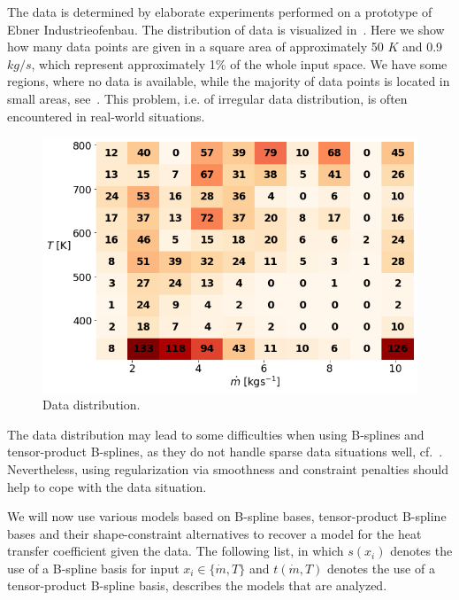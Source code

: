 The data is determined by elaborate experiments performed on a prototype of Ebner Industrieofenbau. The distribution of data is visualized in~. Here we show how many data points are given in a square area of approximately 50 $\si{K}$ and 0.9 $\si{kg}/\si{s}$, which represent approximately 1\% of the whole input space. We have some regions, where no data is available, while the majority of data points is located in small areas, see~. This problem, i.e. of irregular data distribution, is often encountered in real-world situations. 

\begin{figure}[H]
	\centering
	\includegraphics[width=0.8\columnwidth]{graphics/pgfplots/cha5/Ebner/data_distribution.png}
	\caption{Data distribution.}
	\label{fig:ebner_data_situation}
\end{figure}

The data distribution may lead to some difficulties when using B-splines and tensor-product B-splines, as they do not handle sparse data situations well, cf.~. Nevertheless, using regularization via smoothness and constraint penalties should help to cope with the data situation. 

We will now use various models based on B-spline bases, tensor-product B-spline bases and their shape-constraint alternatives to recover a model for the heat transfer coefficient given the data. The following list, in which $s(x_i)$ denotes the use of a B-spline basis for input $x_i \in \{\dot{m}, T\}$ and $t(\dot{m}, T)$ denotes the use of a tensor-product B-spline basis, describes the models that are analyzed. 

